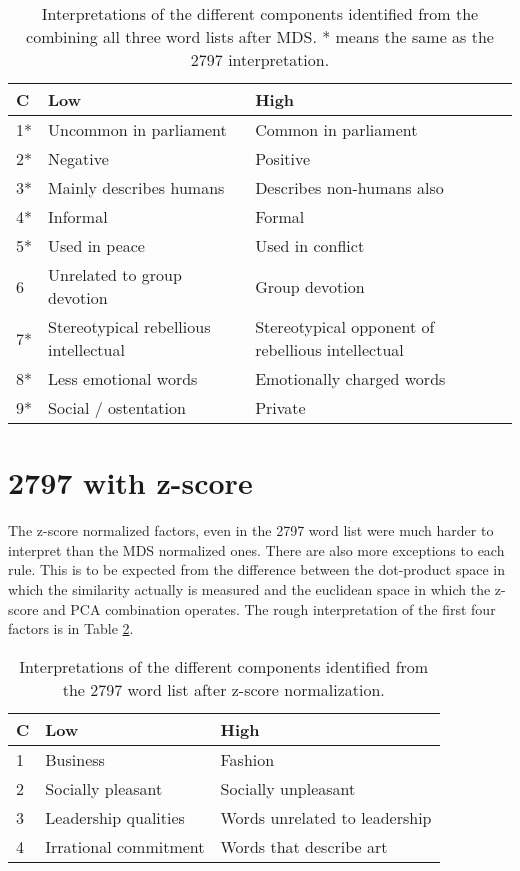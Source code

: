 \documentclass[eric_thesis.tex]{subfiles}
\begin{document}
\begin{table}[tbp]
\begin{tabular}{ | l |p{2in}|p{2in}|}
 \hline
 C & Low & High \\
 \hline
 1* & Uncommon in parliament & Common in parliament\\
 2* & Negative & Positive\\
 3* & Mainly describes humans & Describes non-humans also \\
 4* & Informal & Formal \\
 5* & Used in peace & Used in conflict \\
 6 & Unrelated to group devotion & Group devotion \\
 7* & Stereotypical rebellious intellectual & Stereotypical opponent of 
     rebellious intellectual \\
 8* & Less emotional words & Emotionally charged words \\
 9* & Social / ostentation & Private  \\
 \hline
\end{tabular}
 \caption{Interpretations of the different components identified from the combining
 all three word lists after MDS. * means the same as the 2797 interpretation.}
 \label{tab:2797and438and101mdsinterp}
\end{table}


\section{2797 with z-score}

The z-score normalized factors, even in the 2797 word list were much harder to 
interpret than the MDS normalized ones. There are also more exceptions to each 
rule. This is to be expected from the difference between the dot-product 
space in which the similarity actually is measured and the euclidean space in 
which the z-score and PCA combination operates. The rough interpretation of 
the first four factors is in Table \ref{tab:2797zscoreinterp}.

\begin{table}[tbp]
\begin{tabular}{ | l |p{2in}|p{2in}|}
 \hline
 C & Low & High \\
 \hline
 1 & Business & Fashion \\
 2 & Socially pleasant & Socially unpleasant \\
 3 & Leadership qualities & Words unrelated to leadership \\
 4 & Irrational commitment & Words that describe art \\
 \hline
\end{tabular}
 \caption{Interpretations of the different components identified from the 
 2797 word list after z-score normalization.}
 \label{tab:2797zscoreinterp}
\end{table}
\end{document}
